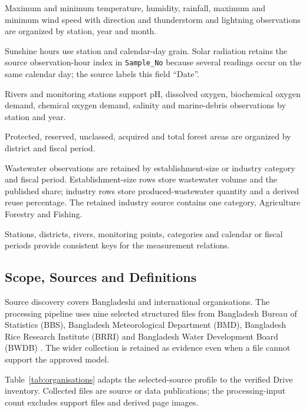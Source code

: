 \begin{description}[leftmargin=0.6cm,style=nextline]
  \item[Monthly climate records] Maximum and minimum temperature, humidity,
  rainfall, maximum and minimum wind speed with direction and thunderstorm and
  lightning observations are organized by station, year and month.
  \item[Daily climate records] Sunshine hours use station and calendar-day
  grain. Solar radiation retains the source observation-hour index in
  \texttt{Sample\_No} because several readings occur on the same calendar day;
  the source labels this field ``Date''.
  \item[Hydrology and water quality] Rivers and monitoring stations support pH,
  dissolved oxygen, biochemical oxygen demand, chemical oxygen demand,
  salinity and marine-debris observations by station and year.
  \item[Forest area] Protected, reserved, unclassed, acquired and total forest
  areas are organized by district and fiscal period.
  \item[Industry] Wastewater observations are retained by establishment-size
  or industry category and fiscal period. Establishment-size rows store
  wastewater volume and the published share; industry rows store
  produced-wastewater quantity and a derived reuse percentage. The retained
  industry source contains one category, Agriculture Forestry and Fishing.
  \item[Reference and time data] Stations, districts, rivers, monitoring
  points, categories and calendar or fiscal periods provide consistent keys for
  the measurement relations.
\end{description}

\subsection{Scope, Sources and Definitions}
\label{subsec:sd}

Source discovery covers Bangladeshi and international organisations. The
processing pipeline uses nine selected structured files from Bangladesh Bureau
of Statistics (BBS), Bangladesh Meteorological Department (BMD), Bangladesh Rice
Research Institute (BRRI) and Bangladesh Water Development Board (BWDB)
\cite{bbs_env_ts,bmd_temperature,brri_daily,bwdb_rivers}. The wider collection
is retained as evidence even when a file cannot support the approved model.

Table~\ref{tab:organisations} adapts the selected-source profile to the
verified Drive inventory. Collected files are source or data publications; the
processing-input count excludes support files and derived page images.

